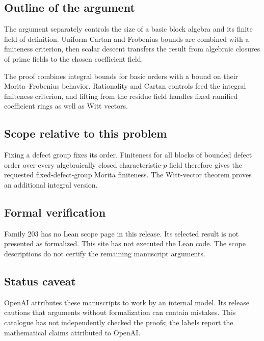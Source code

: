 \documentclass[11pt]{article}
\begin{document}
\subsection{Outline of the argument}
The argument separately controls the size of a basic block algebra and its finite field of definition. Uniform Cartan and Frobenius bounds are combined with a finiteness criterion, then scalar descent transfers the result from algebraic closures of prime fields to the chosen coefficient field.

The proof combines integral bounds for basic orders with a bound on their Morita--Frobenius behavior. Rationality and Cartan controls feed the integral finiteness criterion, and lifting from the residue field handles fixed ramified coefficient rings as well as Witt vectors.

\subsection{Scope relative to this problem}
Fixing a defect group fixes its order. Finiteness for all blocks of bounded defect order over every algebraically closed characteristic-$p$ field therefore gives the requested fixed-defect-group Morita finiteness. The Witt-vector theorem proves an additional integral version.

\subsection{Formal verification}
Family 203 has no Lean scope page in this release. Its selected result is not presented as formalized. This site has not executed the Lean code. The scope descriptions do not certify the remaining manuscript arguments.

\subsection{Status caveat}
OpenAI attributes these manuscripts to work by an internal model. Its release cautions that arguments without formalization can contain mistakes. This catalogue has not independently checked the proofs; the labels report the mathematical claims attributed to OpenAI.
\end{document}

